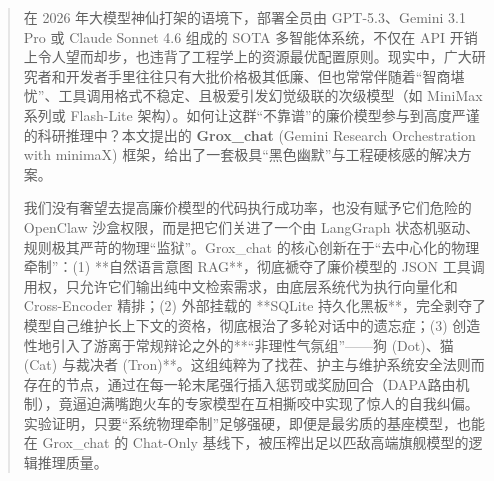 \begin{abstract}
在 2026 年大模型神仙打架的语境下，部署全员由 GPT-5.3、Gemini 3.1 Pro 或 Claude Sonnet 4.6 组成的 SOTA 多智能体系统，不仅在 API 开销上令人望而却步，也违背了工程学上的资源最优配置原则。现实中，广大研究者和开发者手里往往只有大批价格极其低廉、但也常常伴随着“智商堪忧”、工具调用格式不稳定、且极爱引发幻觉级联的次级模型（如 MiniMax 系列或 Flash-Lite 架构）。如何让这群“不靠谱”的廉价模型参与到高度严谨的科研推理中？本文提出的 \textbf{Grox\_chat} (Gemini Research Orchestration with minimaX) 框架，给出了一套极具“黑色幽默”与工程硬核感的解决方案。

我们没有奢望去提高廉价模型的代码执行成功率，也没有赋予它们危险的 OpenClaw 沙盒权限，而是把它们关进了一个由 LangGraph 状态机驱动、规则极其严苛的物理“监狱”。Grox\_chat 的核心创新在于“去中心化的物理牵制”：(1) **自然语言意图 RAG**，彻底褫夺了廉价模型的 JSON 工具调用权，只允许它们输出纯中文检索需求，由底层系统代为执行向量化和 Cross-Encoder 精排；(2) 外部挂载的 **SQLite 持久化黑板**，完全剥夺了模型自己维护长上下文的资格，彻底根治了多轮对话中的遗忘症；(3) 创造性地引入了游离于常规辩论之外的**“非理性气氛组”——狗 (Dot)、猫 (Cat) 与裁决者 (Tron)**。这组纯粹为了找茬、护主与维护系统安全法则而存在的节点，通过在每一轮末尾强行插入惩罚或奖励回合（DAPA路由机制），竟逼迫满嘴跑火车的专家模型在互相撕咬中实现了惊人的自我纠偏。实验证明，只要“系统物理牵制”足够强硬，即便是最劣质的基座模型，也能在 Grox\_chat 的 Chat-Only 基线下，被压榨出足以匹敌高端旗舰模型的逻辑推理质量。
\end{abstract}